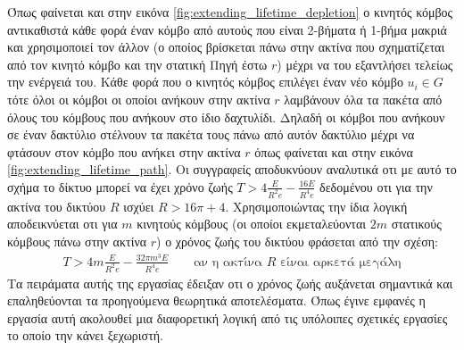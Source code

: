 Όπως φαίνεται και στην εικόνα \ref{fig:extending_lifetime_depletion} ο κινητός κόμβος αντικαθιστά κάθε φορά έναν κόμβο από αυτούς που είναι 2-βήματα ή 1-βήμα μακριά
και χρησιμοποιεί τον άλλον (ο οποίος βρίσκεται πάνω στην ακτίνα που σχηματίζεται από τον κινητό κόμβο και την στατική Πηγή έστω $r$) μέχρι να του εξαντλήσει τελείως
την ενέργειά του. Κάθε φορά που ο κινητός κόμβος επιλέγει έναν νέο κόμβο $u_{i}\in G$ τότε όλοι οι κόμβοι οι οποίοι ανήκουν στην ακτίνα $r$ λαμβάνουν όλα τα πακέτα
από όλους του κόμβους που ανήκουν στο ίδιο δαχτυλίδι. Δηλαδή οι κόμβοι που ανήκουν σε έναν δακτύλιο στέλνουν τα πακέτα τους πάνω από αυτόν δακτύλιο μέχρι να φτάσουν
στον κόμβο που ανήκει στην ακτίνα $r$ όπως φαίνεται και στην εικόνα \ref{fig:extending_lifetime_path}. Οι συγγραφείς αποδυκνύουν αναλυτικά οτι με αυτό το σχήμα το
δίκτυο μπορεί να έχει χρόνο ζωής  $T>4\frac{E}{R^{2}e}-\frac{16E}{R^{4}e}$ δεδομένου οτι για την ακτίνα του δικτύου $R$ ισχύει $R>16\pi+4$. Χρησιμοποιώντας την ίδια
λογική αποδεικνύεται οτι για $m$ κινητούς κόμβους (οι οποίοι εκμεταλεύονται $2m$ στατικούς κόμβους πάνω στην ακτίνα $r$) ο χρόνος ζωής του δικτύου φράσεται από την
σχέση:
\begin{align*}
T>4m\frac{E}{R^{2}e}-\frac{32\pi m^{3}E}{R^{4}e} \qquad\text{αν η ακτίνα $R$ είναι αρκετά μεγάλη}
\end{align*}
Τα πειράματα αυτής της εργασίας έδειξαν οτι ο χρόνος ζωής αυξάνεται σημαντικά και επαληθεύονται τα προηγούμενα θεωρητικά αποτελέσματα. Όπως έγινε εμφανές η εργασία
αυτή ακολουθεί μια διαφορετική λογική από τις υπόλοιπες σχετικές εργασίες το οποίο την κάνει ξεχωριστή.

